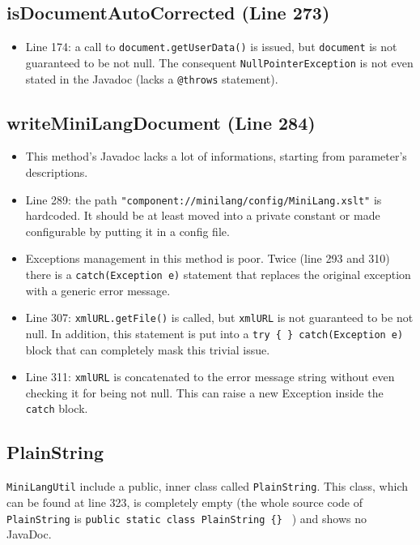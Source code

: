 \documentclass[11pt]{article} %
\begin{document}
\subsection{isDocumentAutoCorrected (Line 273)}
\begin{itemize}
	\item Line 174: a call to \texttt{document.getUserData()} is issued, but \texttt{document} is not guaranteed to be not null. The consequent  \texttt{NullPointerException} is not even stated in the Javadoc (lacks a  \texttt{@throws} statement).
\end{itemize}

\subsection{writeMiniLangDocument (Line 284)}
\begin{itemize}
	\item This method's Javadoc lacks a lot of informations, starting from parameter's descriptions.
	\item Line 289: the path \texttt{"component://minilang/config/MiniLang.xslt"} is hardcoded. It should be at least moved into a private constant or made configurable by putting it in a config file.
	\item Exceptions management in this method is poor. Twice (line 293 and 310) there is a \texttt{catch(Exception e)} statement that replaces the original exception with a generic error message.
	\item Line 307: \texttt{xmlURL.getFile()} is called, but \texttt{xmlURL} is not guaranteed to be not null. In addition, this statement is put into a \texttt{try \{ \} catch(Exception e)} block that can completely mask this trivial issue.
	\item Line 311: \texttt{xmlURL} is concatenated to the error message string without even checking it for being not null. This can raise a new Exception inside the \texttt{catch} block.
\end{itemize}

\subsection{PlainString}

\texttt{MiniLangUtil} include a public, inner class called \texttt{PlainString}. This class, which can be found at line 323, is completely empty (the whole source code of \texttt{PlainString} is \texttt{public static class PlainString \{\} }  ) and shows no JavaDoc.
\end{document}
